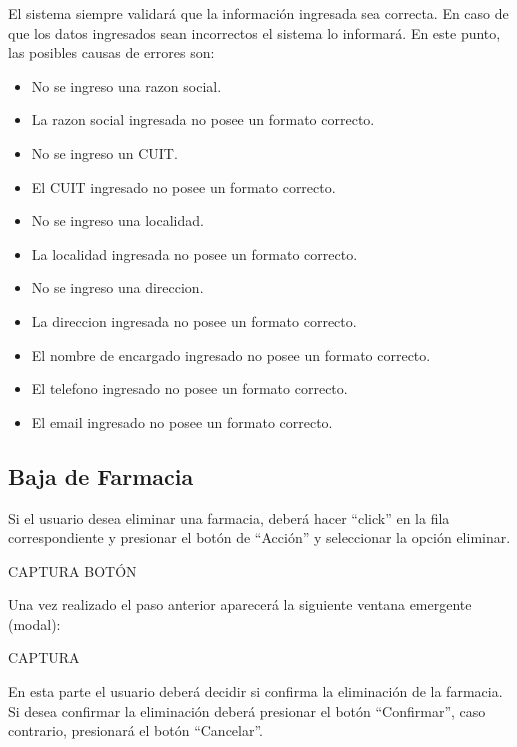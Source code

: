 \documentclass[letterpaper,10pt,spanish]{sphinxmanual}
\begin{document}
El sistema siempre validará que la información ingresada sea correcta. En caso de que los datos ingresados sean incorrectos el sistema lo informará.
En este punto, las posibles causas de errores son:
\begin{itemize}
\item {} 
No se ingreso una razon social.

\item {} 
La razon social ingresada no posee un formato correcto.

\item {} 
No se ingreso un CUIT.

\item {} 
El CUIT ingresado no posee un formato correcto.

\item {} 
No se ingreso una localidad.

\item {} 
La localidad ingresada no posee un formato correcto.

\item {} 
No se ingreso una direccion.

\item {} 
La direccion ingresada no posee un formato correcto.

\item {} 
El nombre de encargado ingresado no posee un formato correcto.

\item {} 
El telefono ingresado no posee un formato correcto.

\item {} 
El email ingresado no posee un formato correcto.

\end{itemize}


\subsection{Baja de Farmacia}
\label{farmacias:baja-de-farmacia}
Si el usuario desea eliminar una farmacia, deberá hacer “click” en la fila correspondiente y presionar el botón de “Acción” y seleccionar la opción eliminar.

CAPTURA BOTÓN

Una vez realizado el paso anterior aparecerá la siguiente ventana emergente (modal):

CAPTURA

En esta parte el usuario deberá decidir si confirma la eliminación de la farmacia. Si desea confirmar la eliminación deberá presionar el botón “Confirmar”, caso contrario, presionará el botón “Cancelar”.
\end{document}
